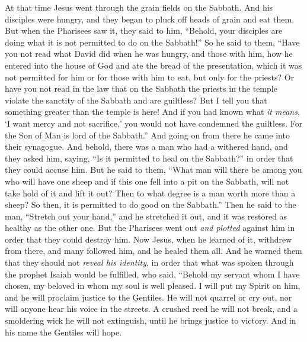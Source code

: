 \begin{biblechapter} %
 At that time Jesus went through the grain fields on the Sabbath. And his disciples were hungry, and they began to pluck off heads of grain and eat them.
\verse But when the Pharisees saw it, they said to him, “Behold, your disciples are doing what it is not permitted to do on the Sabbath!”
\verse So he said to them, “Have you not read what David did when he was hungry, and those with him,
\verse how he entered into the house of God and ate the bread of the presentation, which it was not permitted for him or for those with him to eat, but only for the priests?
\verse Or have you not read in the law that on the Sabbath the priests in the temple violate the sanctity of the Sabbath and are guiltless?
\verse But I tell you that something greater than the temple is here!
\verse And if you had known what \textit{it means}, ‘I want mercy and not sacrifice,’ you would not have condemned the guiltless.
\verse For the Son of Man is lord of the Sabbath.”
 And going on from there he came into their synagogue.
\verse And behold, there was a man who had a withered hand, and they asked him, saying, “Is it permitted to heal on the Sabbath?” in order that they could accuse him.
\verse But he said to them, “What man will there be among you who will have one sheep and if this one fell into a pit on the Sabbath, will not take hold of it and lift it out?
\verse Then to what degree is a man worth more than a sheep? So then, it is permitted to do good on the Sabbath.”
\verse Then he said to the man, “Stretch out your hand,” and he stretched it out, and it was restored as healthy as the other one.
\verse But the Pharisees went out \textit{and plotted} against him in order that they could destroy him.
 Now Jesus, when he learned of it, withdrew from there, and many followed him, and he healed them all.
\verse And he warned them that they should not \textit{reveal his identity},
\verse in order that what was spoken through the prophet Isaiah would be fulfilled, who said,
\verse “Behold my servant whom I have chosen, 
my beloved in whom my soul is well pleased. 
I will put my Spirit on him, 
and he will proclaim justice to the Gentiles.
\verse He will not quarrel or cry out, 
nor will anyone hear his voice in the streets.
\verse A crushed reed he will not break, 
and a smoldering wick he will not extinguish, 
until he brings justice to victory.
\verse And in his name the Gentiles will hope.

\end{biblechapter}
